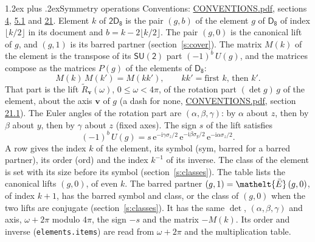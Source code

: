 \documentclass[10pt,a4paper]{article}
\makeatletter
\renewcommand\section{\@startsection{section}{1}{\z@}{-3ex plus -1ex minus -.2ex}%
  {1.2ex plus .2ex}{\normalfont\large\sffamily\bfseries\color{parttitle}}}
\numberwithin{equation}{section}
\newcommand{\eltfont}[1]{{\let\sigma\eltsigma\mathelt{#1}}}
\newcommand{\grp}[1]{\mathsf{#1}}
\newcommand{\elt}[1]{\eltfont{#1}}
\newcommand{\vv}{\mathbf{v}}
\newcommand{\iunit}{\mathrm{i}}
\newcommand{\expe}{\mathrm{e}}
\newcommand{\barred}[1]{\bar{#1}}
\newcommand{\lift}[1]{\tilde{#1}}
\newcommand{\pauli}[1]{\sigma_{#1}}
\makeatother
\begin{document}
\section{Symmetry operations}\label{s:elements}
Conventions: \href{../../CONVENTIONS.pdf}{CONVENTIONS.pdf}, sections \href{../../../rotation/CONVENTIONS.pdf\#conv.4}{4}, \href{../../../rotation/CONVENTIONS.pdf\#conv.5.1}{5.1} and \href{../../CONVENTIONS.pdf\#conv.21}{21}.
\leavevmode\label{n:index.element}\label{n:element.g}Element $k$ of $\grp{2D_{8}}$ is the pair $(g, b)$ of the element $g$ of \href{../../../rotation/data/pdf/D8.pdf}{$\grp{D_{8}}$} of index $\lfloor k/2\rfloor$ in its document and $b = k - 2\lfloor k/2\rfloor$. The pair $(g, 0)$ is the canonical lift of $g$, and $(g, 1)$ is its barred partner (section~\ref{s:cover}). \label{n:matrix.element.pin}\label{n:matrix.element}The matrix $M(k)$ of the element is the transpose of its $\grp{SU(2)}$ part $(-1)^{b}\,U(g)$, and the matrices compose as the matrices $P(g)$ of the elements of $\grp{D_{8}}$:
\begin{equation}\label{e:mprod}M(k)\,M(k') = M(kk'),\qquad kk' = \text{first } k\text{, then } k'.\end{equation}
\leavevmode\label{n:angle.omega}\label{n:vector.axis}\label{n:vector.pole}That part is the lift $\lift{R}_{\vv}(\omega)$, $0 \le \omega < 4\pi$, of the rotation part $(\det g)\,g$ of the element, about the axis $\vv$ of $g$ (a dash for none, \href{../../CONVENTIONS.pdf}{CONVENTIONS.pdf}, section \href{../../CONVENTIONS.pdf\#conv.21.1}{21.1}). \label{n:angle.euler.alpha}\label{n:angle.euler.beta}\label{n:angle.euler.gamma}\label{n:vector.coordinates}The Euler angles of the rotation part are $(\alpha,\beta,\gamma)$: by $\alpha$ about $z$, then by $\beta$ about $y$, then by $\gamma$ about $z$ (fixed axes). \label{n:local.euler.sign}The sign $s$ of the lift satisfies
\begin{equation}\label{e:euler}(-1)^{b}\,U(g) = s\,\expe^{-\iunit\gamma\pauli{z}/2}\,\expe^{-\iunit\beta\pauli{y}/2}\,\expe^{-\iunit\alpha\pauli{z}/2}.\end{equation}
\leavevmode\label{n:index.element.inverse}\label{n:head.sym}\label{n:head.ord}A row gives the index $k$ of the element, its symbol (sym, barred for a barred partner), its order (ord) and the index $k^{-1}$ of its inverse. \label{n:head.class}The class of the element is set with its size before its symbol (section~\ref{s:classes}).
The table lists the canonical lifts $(g, 0)$, of even $k$. The barred partner $(g, 1) = \elt{\barred{E}}\,(g, 0)$, of index $k + 1$, has the barred symbol and class, or the class of $(g, 0)$ when the two lifts are conjugate (section~\ref{s:classes}). It has the same $\det$, $(\alpha,\beta,\gamma)$ and axis, $\omega + 2\pi$ modulo $4\pi$, the sign $-s$ and the matrix $-M(k)$. Its order and inverse (\texttt{elements.items}) are read from $\omega + 2\pi$ and the multiplication table.
\end{document}
